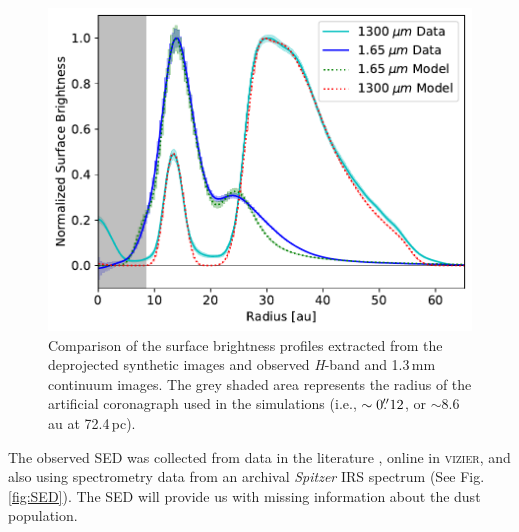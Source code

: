 \documentclass[letters,usenatbib,times]{mnras}
\begin{document}
\begin{figure}
	\includegraphics[width=\columnwidth]{comp_fig_all_profiles_au.pdf}
    \caption{Comparison of the surface brightness profiles extracted from the deprojected synthetic images and observed \textit{H}-band and 1.3\,mm continuum images. The grey shaded area represents the radius of the artificial coronagraph used in the simulations (i.e., $\sim0\hbox{$.\!\!^{\prime\prime}$} 12$, or $\sim$8.6\,au at 72.4\,pc).}
    \label{fig:radprofiles}
\end{figure}

The observed SED was collected from data in the literature \citep{1988iras....7.....H, 1990A&A...234..230H, Jensen_97, 2000A&A...355L..27H, 2001KFNT...17..409K, 2003yCat.2246....0C, 2007PASJ...59S.369M, 2008PASP..120.1128O, 2010A&A...514A...1I, 2012yCat.2311....0C}, online in \textsc{vizier}, and also using spectrometry data from an archival \textit{Spitzer} IRS spectrum (See Fig.\ref{fig:SED}). The SED will provide us with missing information about the dust population.
\end{document}
